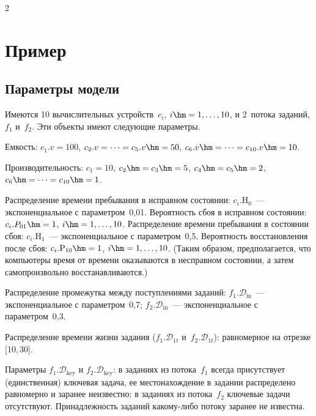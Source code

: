 \begin{multicols}{2}
\vspace*{-6pt}

\section{Пример}

\vspace*{-3pt}

\subsection{Параметры модели}

    Имеются 10 вычислительных устройств~$c_i$, $i\hm=1,\ldots , 10$, и 
2~потока заданий, $f_1$ и~$f_2$. Эти объекты имеют следующие параметры.
    
    Емкость: $c_1.v=100$, $c_2.v=\cdots =c_5.v\hm=50$, $c_6.v\hm=\cdots = 
c_{10}.v\hm=10$.
    
    Производительность: $c_1=10$, $c_2\hm=c_3\hm=5$, $c_4\hm=c_5\hm=2$, 
$c_6\hm=\cdots = c_{10}\hm=1$.
    
    Распределение времени пребывания в исправном состоянии: 
    $c_i.\mathrm{H}_0$~--- экспоненциальное с параметром~0,01. Вероятность сбоя в 
исправном состоянии: $c_i.P_{01}\hm=1$, $i\hm=1,\ldots , 10$. Распределение 
времени пребывания в состоянии сбоя: $c_i.\mathrm{H}_1$~--- экспоненциальное с 
параметром~0,5. Вероятность восстановления после сбоя: 
$c_i.\mathrm{P}_{10}\hm=1$, $i\hm=1,\ldots , 10$. (Таким образом, предполагается, что 
компьютеры время от времени оказываются в несправном состоянии, а 
затем самопроизвольно восстанавливаются.)
    
    Распределение промежутка между поступлениями заданий: 
$f_1.\mathcal{D}_{\mathrm{in}}$~--- экспоненциальное с па\-ра\-мет\-ром~0,7; 
$f_2.\mathcal{D}_{\mathrm{in}}$~--- экспоненциальное с па\-ра\-мет\-ром~0,3.
    
    Распределение времени жизни задания ($f_1.\mathcal{D}_{1t}$ 
и~$f_2.\mathcal{D}_{1t}$): равномерное на отрезке [10,\,30].
    
    Параметры $f_1.\mathcal{D}_{\mathrm{key}}$ и $f_2.\mathcal{D}_{\mathrm{key}}$: в заданиях 
из потока~$f_1$ всегда присутствует (единственная) ключевая задача, ее 
местонахождение в задании распределено равномерно и заранее неизвестно; 
в заданиях из потока~$f_2$ ключевые задачи отсутствуют. Принадлежность 
заданий какому-либо потоку заранее не известна.

    \begin{table}[b]\small
    \begin{center}
    \vspace*{2ex}
    

\end{center}
\end{table}
\end{multicols}
